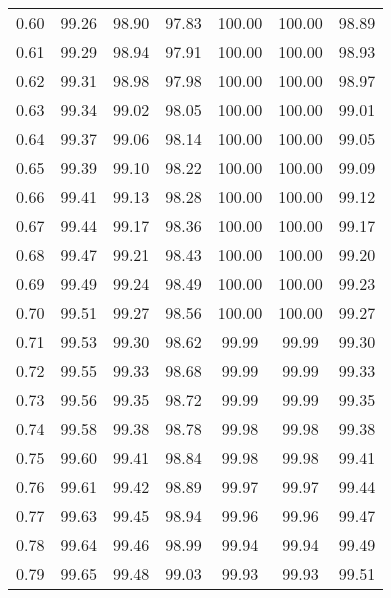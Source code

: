 \begin{tabular}{|c|c|c|c|c|c|c|}
      0.60 &     99.26 &     98.90 &      97.83 &  100.00 &     100.00 &         98.89 \\
      0.61 &     99.29 &     98.94 &      97.91 &  100.00 &     100.00 &         98.93 \\
      0.62 &     99.31 &     98.98 &      97.98 &  100.00 &     100.00 &         98.97 \\
      0.63 &     99.34 &     99.02 &      98.05 &  100.00 &     100.00 &         99.01 \\
      0.64 &     99.37 &     99.06 &      98.14 &  100.00 &     100.00 &         99.05 \\
      0.65 &     99.39 &     99.10 &      98.22 &  100.00 &     100.00 &         99.09 \\
      0.66 &     99.41 &     99.13 &      98.28 &  100.00 &     100.00 &         99.12 \\
      0.67 &     99.44 &     99.17 &      98.36 &  100.00 &     100.00 &         99.17 \\
      0.68 &     99.47 &     99.21 &      98.43 &  100.00 &     100.00 &         99.20 \\
      0.69 &     99.49 &     99.24 &      98.49 &  100.00 &     100.00 &         99.23 \\
      0.70 &     99.51 &     99.27 &      98.56 &  100.00 &     100.00 &         99.27 \\
      0.71 &     99.53 &     99.30 &      98.62 &   99.99 &      99.99 &         99.30 \\
      0.72 &     99.55 &     99.33 &      98.68 &   99.99 &      99.99 &         99.33 \\
      0.73 &     99.56 &     99.35 &      98.72 &   99.99 &      99.99 &         99.35 \\
      0.74 &     99.58 &     99.38 &      98.78 &   99.98 &      99.98 &         99.38 \\
      0.75 &     99.60 &     99.41 &      98.84 &   99.98 &      99.98 &         99.41 \\
      0.76 &     99.61 &     99.42 &      98.89 &   99.97 &      99.97 &         99.44 \\
      0.77 &     99.63 &     99.45 &      98.94 &   99.96 &      99.96 &         99.47 \\
      0.78 &     99.64 &     99.46 &      98.99 &   99.94 &      99.94 &         99.49 \\
      0.79 &     99.65 &     99.48 &      99.03 &   99.93 &      99.93 &         99.51 \\

\end{tabular}
